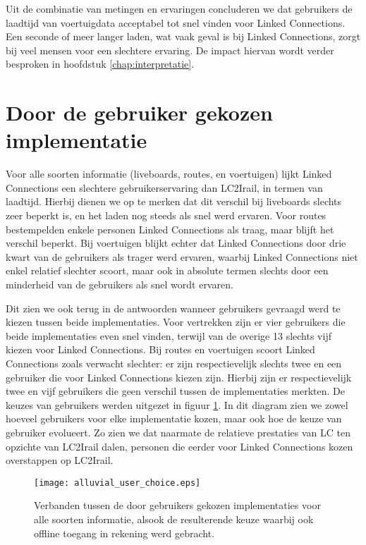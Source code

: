 Uit de combinatie van metingen en ervaringen concluderen we dat gebruikers de laadtijd van voertuigdata acceptabel tot snel vinden voor Linked Connections. Een seconde of meer langer laden, wat vaak geval is bij Linked Connections, zorgt bij veel mensen voor een slechtere ervaring. De impact hiervan wordt verder besproken in hoofdstuk \ref{chap:interpretatie}.

\section{Door de gebruiker gekozen implementatie}

Voor alle soorten informatie (liveboards, routes, en voertuigen) lijkt Linked Connections een slechtere gebruikerservaring dan LC2Irail, in termen van laadtijd. Hierbij dienen we op te merken dat dit verschil bij liveboards slechts zeer beperkt is, en het laden nog steeds als snel werd ervaren. Voor routes bestempelden enkele personen Linked Connections als traag, maar blijft het verschil beperkt. Bij voertuigen blijkt echter dat Linked Connections door drie kwart van de gebruikers als trager werd ervaren, waarbij Linked Connections niet enkel relatief slechter scoort, maar ook in absolute termen slechts door een minderheid van de gebruikers als snel wordt ervaren. 

Dit zien we ook terug in de antwoorden wanneer gebruikers gevraagd werd te kiezen tussen beide implementaties. Voor vertrekken zijn er vier gebruikers die beide implementaties even snel vinden, terwijl van de overige 13 slechts vijf kiezen voor Linked Connections. Bij routes en voertuigen scoort Linked Connections zoals verwacht slechter: er zijn respectievelijk slechts twee en een gebruiker die voor Linked Connections kiezen zijn. Hierbij zijn er respectievelijk twee en vijf gebruikers die geen verschil tussen de implementaties merkten. De keuzes van gebruikers werden uitgezet in figuur \ref{fig:alluvialUserChoices}. In dit diagram zien we zowel hoeveel gebruikers voor elke implementatie kozen, maar ook hoe de keuze van gebruiker evolueert. Zo zien we dat naarmate de relatieve prestaties van LC ten opzichte van LC2Irail dalen, personen die eerder voor Linked Connections kozen overstappen op LC2Irail.

\begin{figure}[ht]
	\centering
	\texttt{[image: alluvial\_user\_choice.eps]}
	\caption[Door gebruikers gekozen implementatie]{Verbanden tussen de door gebruikers gekozen implementaties voor alle soorten informatie, alsook de resulterende keuze waarbij ook offline toegang in rekening werd gebracht. }
	\label{fig:alluvialUserChoices}
\end{figure}

